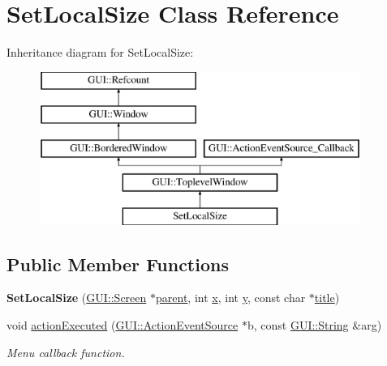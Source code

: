 \hypertarget{classSetLocalSize}{\section{Set\-Local\-Size Class Reference}
\label{classSetLocalSize}
}
Inheritance diagram for Set\-Local\-Size\-:\begin{figure}[H]
\begin{center}
\leavevmode
\includegraphics[height=5.000000cm]{classSetLocalSize}
\end{center}
\end{figure}
\subsection*{Public Member Functions}
\begin{DoxyCompactItemize}
\item 
\hypertarget{classSetLocalSize_ad879d8b7630efd7dae269f86b2f48167}{{\bfseries Set\-Local\-Size} (\hyperlink{classGUI_1_1Screen}{G\-U\-I\-::\-Screen} $\ast$\hyperlink{classGUI_1_1Window_a2e593ff65e7702178d82fe9010a0b539}{parent}, int \hyperlink{classGUI_1_1Window_a6ca6a80ca00c9e1d8ceea8d3d99a657d}{x}, int \hyperlink{classGUI_1_1Window_a0ee8e923aff2c3661fc2e17656d37adf}{y}, const char $\ast$\hyperlink{classGUI_1_1ToplevelWindow_a04de191f9a57b5b584657866a4ac6843}{title})}\label{classSetLocalSize_ad879d8b7630efd7dae269f86b2f48167}

\item 
\hypertarget{classSetLocalSize_ab71c2d90d683ddc1fdd31ee3fe972fa0}{void \hyperlink{classSetLocalSize_ab71c2d90d683ddc1fdd31ee3fe972fa0}{action\-Executed} (\hyperlink{classGUI_1_1ActionEventSource}{G\-U\-I\-::\-Action\-Event\-Source} $\ast$b, const \hyperlink{classGUI_1_1String}{G\-U\-I\-::\-String} \&arg)}\label{classSetLocalSize_ab71c2d90d683ddc1fdd31ee3fe972fa0}

\begin{DoxyCompactList}\small\item\em Menu callback function. \end{DoxyCompactList}\end{DoxyCompactItemize}
